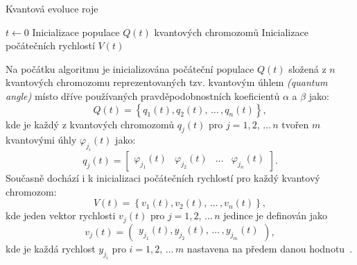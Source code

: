 \begin{algorithm}[ht]
    \caption{Kvantová evoluce roje~\cite{qse}}
    \label{alg:qse}
    $t \gets 0$\;
    Inicializace populace $Q\left(t\right)$ kvantových chromozomů\;
    Inicializace počátečních rychlostí $V\left(t\right)$\;
\end{algorithm}

Na počátku algoritmu je inicializována počáteční populace $Q(t)$ složená z $n$ kvantových chromozomu reprezentovaných tzv. kvantovým úhlem \emph{(quantum angle)} místo dříve používaných pravděpodobnostních koeficientů $\alpha$ a $\beta$ jako:
\begin{equation*}
    Q\left(t\right) = \left\{q_1\left(t\right), q_2\left(t\right),\,\dots\,,q_n\left(t\right)\right\},
\end{equation*}
kde je každý z kvantových chromozomů $q_j\left(t\right)$ pro $j=1,2,\,\dots\,n$ tvořen $m$ kvantovými úhly $\varphi_{j_i}\left(t\right)$ jako:
\begin{equation*}
    q_j\left(t\right) = \begin{bmatrix} \varphi_{j_1}\left(t\right) & \varphi_{j_2}\left(t\right) & \dots & \varphi_{j_n}\left(t\right) \end{bmatrix}.
\end{equation*}
Současně dochází i k inicializaci počátečních rychlostí pro každý kvantový chromozom:
\begin{equation*}
    V\left(t\right) = \left\{ v_1\left(t\right), v_2\left(t\right) ,\,\dots\,, v_n\left(t\right)\right\},
\end{equation*}
kde jeden vektor rychlosti $v_j\left(t\right)$ pro $j=1,2,\,\dots\,n$ jedince je definován jako
\begin{equation*}
    v_j\left(t\right) = \begin{pmatrix} y_{j_1}\left(t\right), y_{j_2}\left(t\right),\,\dots\,, y_{j_m}\left(t\right) \end{pmatrix},
\end{equation*}
kde je každá rychlost $y_{j_i}$ pro $i=1,2,\,\dots\,m$ nastavena na předem danou hodnotu~\cite{qse}.


